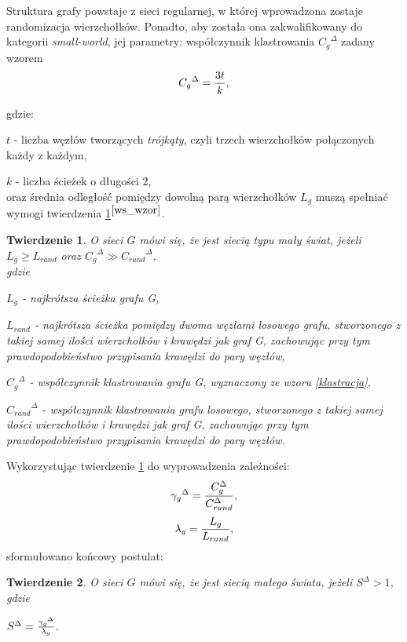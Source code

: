 \documentclass[a4paper, 12pt, twoside, openright]{article}
\newtheorem{theorem}{Twierdzenie}
\begin{document}
	Struktura grafy powstaje z sieci regularnej, w której wprowadzona zostaje randomizacja wierzchołków. Ponadto, aby została ona zakwalifikowany do kategorii \textit{small-world}, jej parametry: współczynnik klastrowania ${C_g}^{\Delta}$ zadany wzorem
	\begin{equation}
		\label{klastracja}
		{C_g}^{\Delta}  = {{3t} \over {k}},
	\end{equation}
	\par gdzie:\indent\par 
	$t$ - liczba węzłów tworzących \textit{trójkąty}, czyli trzech wierzchołków połączonych każdy z każdym,\indent\par
	$k$ - liczba ścieżek o długości 2,\\
	 oraz średnia odległość pomiędzy dowolną parą wierzchołków $L_g$ muszą spełniać wymogi twierdzenia \ref{ctwWS}$^{\cite{ws_wzor}}$. 
	\newpage
	\begin{theorem}
		\label{ctwWS}
		O sieci $G$ mówi się, że jest siecią typu \textit{mały świat}, jeżeli $L_g \ge L_{rand}$ oraz ${C_g}^{\Delta} \gg {C_{rand}}^{\Delta}$, \\gdzie\indent\par
		$L_g$ - najkrótsza ścieżka grafu G,\indent\par
		$L_{rand}$ - najkrótsza ścieżka pomiędzy dwoma węzłami losowego grafu, stworzonego z takiej samej ilości wierzchołków i krawędzi jak graf G, zachowując przy tym prawdopodobieństwo przypisania krawędzi do pary węzłów,\indent\par
		${C_g}^{\Delta}$ - współczynnik klastrowania grafu G, wyznaczony ze wzoru \ref{klastracja},\indent\par
		${C_{rand}}^{\Delta}$ - współczynnik klastrowania grafu losowego, stworzonego z takiej samej ilości wierzchołków i krawędzi jak graf G, zachowując przy tym prawdopodobieństwo przypisania krawędzi do pary węzłów.
	\end{theorem}
	Wykorzystując twierdzenie \ref{ctwWS} do wyprowadzenia zależności:
	\begin{equation}
	 	\label{gamma}
		{\gamma_g}^{\Delta} = {{C_g^{\Delta}} \over {C_{rand}^{\Delta}}},
	\end{equation}
 	\begin{equation}
	 	\label{lambda}
	 	{\lambda_g}  = {{L_g} \over {L_{rand}}},
 	\end{equation}
	 sformułowano końcowy postulat:
	\begin{theorem}
		\label{twWS}
		O sieci $G$ mówi się, że jest siecią \textit{małego świata}, jeżeli ${S}^{\Delta} > 1$, \\gdzie \indent\par${S}^{\Delta} = {{{\gamma_g}^{\Delta}} \over {\lambda_g}}$.
	\end{theorem}
\end{document}
